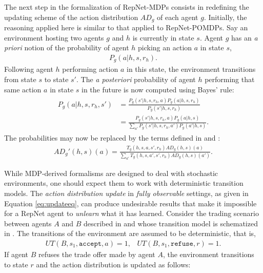 The next step in the formalization of RepNet-MDPs consists in redefining the updating scheme of the action distribution $AD_g$ of each agent $g$. Initially, the reasoning applied here is similar to that applied to RepNet-POMDPs. Say an environment hosting two agents $g$ and $h$ is currently in state $s$. Agent $g$ has an \textit{a priori} notion of the probability of agent $h$ picking an action $a$ in state $s$,
\begin{align}
    P_g(a | h, s,r_h).
\end{align}
Following agent $h$ performing action $a$ in this state, the environment transitions from state $s$ to state $s'$. The \textit{a posteriori} probability of agent $h$ performing that same action $a$ in state $s$ in the future is now computed using Bayes' rule:
\begin{align}
\begin{split}
    P_g(a | h,s,r_h,s') &= \frac{P_g(s' | h,s,r_h,a) P_g(a | h, s,r_h)}{P_g(s'|h,s,r_h)} 
    \\
    &= \frac{P_g(s' | h,s,r_h,a) P_g(a | h, s)}{\sum_{a'} P_g(s'|h,s,r_h,a') P_g(a' | h,s)}.
\end{split}
\end{align}
The probabilities may now be replaced by the terms defined in  and :
\begin{align}
\label{eq:updateeq}
    AD_g'(h,s)(a) = \frac{T_g(h,s,a,s', r_h) AD_g(h,s)(a)}{\sum_{a'} T_g(h,s,a',s', r_h) AD_g(h,s)(a')}.
\end{align}




While MDP-derived formalisms are designed to deal with stochastic environments, one should expect them to work with deterministic transition models. The \textit{action distribution update} in \textit{fully observable} settings, as given in Equation \ref{eq:updateeq}, can produce undesirable results that make it impossible for a RepNet agent to \textit{unlearn} what it has learned.
Consider the trading scenario between agents $A$ and $B$ described in  and whose transition model is schematized in . The transitions of the environment are assumed to be deterministic, that is,
\begin{align}
    UT(B, s_1, \texttt{accept}, a) = 1, \,\,\,\,\, UT(B, s_1, \texttt{refuse}, r) = 1.
\end{align}
If agent $B$ refuses the trade offer made by agent $A$, the environment transitions to state $r$ and the action distribution is updated as follows:

